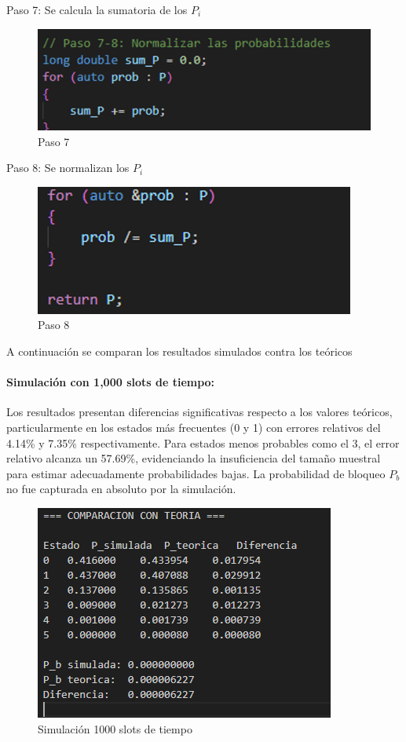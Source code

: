 \documentclass{article}
\begin{document}
Paso 7: Se calcula la sumatoria de los $P_i$
\begin{figure}[H]
    \centering
    \includegraphics[width=0.75\linewidth]{images/imageGeoGeoMCalc8.png}
    \caption{Paso 7}
    \label{fig:enter-label}
\end{figure}

Paso 8: Se normalizan los $P_i$
\begin{figure}[H]
    \centering
    \includegraphics[width=0.75\linewidth]{images/imageGeoGeoMCalc9.png}
    \caption{Paso 8}
    \label{fig:enter-label}
\end{figure}

A continuación se comparan los resultados simulados contra los teóricos

\paragraph{Simulación con 1,000 slots de tiempo:}
Los resultados presentan diferencias significativas respecto a los valores teóricos, particularmente en los estados más frecuentes (0 y 1) con errores relativos del 4.14\% y 7.35\% respectivamente. Para estados menos probables como el 3, el error relativo alcanza un 57.69\%, evidenciando la insuficiencia del tamaño muestral para estimar adecuadamente probabilidades bajas. La probabilidad de bloqueo $P_b$ no fue capturada en absoluto por la simulación.

\begin{figure}[H]
    \centering
    \includegraphics[width=0.75\linewidth]{images/imageGeoGeoMCalc10.png}
    \caption{Simulación 1000 slots de tiempo}
    \label{fig:enter-label}
\end{figure}
\end{document}
